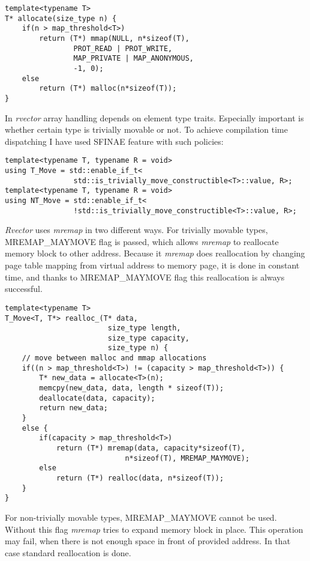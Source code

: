 \documentclass[inz, english, shortabstract]{iithesis}
\begin{document}
\begin{lstlisting}[caption=rvector allocation]
template<typename T>
T* allocate(size_type n) {
	if(n > map_threshold<T>)
    	return (T*) mmap(NULL, n*sizeof(T), 
                PROT_READ | PROT_WRITE,
                MAP_PRIVATE | MAP_ANONYMOUS,
                -1, 0);
    else
    	return (T*) malloc(n*sizeof(T));
}
\end{lstlisting}
In {\it rvector} array handling depends on element type traits. Especially important is whether certain type is trivially movable or not. To achieve compilation time dispatching I have used SFINAE feature with such policies:

\begin{lstlisting}[caption=SFINAE policies]
template<typename T, typename R = void>
using T_Move = std::enable_if_t<
				std::is_trivially_move_constructible<T>::value, R>;
template<typename T, typename R = void>
using NT_Move = std::enable_if_t<
				!std::is_trivially_move_constructible<T>::value, R>;
\end{lstlisting}
{\it Rvector} uses {\it mremap} in two different ways. For trivially movable types, MREMAP\_MAYMOVE flag is passed, which allows {\it mremap} to reallocate memory block to other address. Because it {\it mremap} does reallocation by changing page table mapping from virtual address to memory page\cite{mremap}, it is done in constant time, and thanks to MREMAP\_MAYMOVE flag this reallocation is always successful. 

\begin{lstlisting}[caption=rvector trivial type reallocation]
template<typename T>
T_Move<T, T*> realloc_(T* data, 
						size_type length, 
						size_type capacity, 
						size_type n) {
	// move between malloc and mmap allocations
	if((n > map_threshold<T>) != (capacity > map_threshold<T>)) {
        T* new_data = allocate<T>(n);
        memcpy(new_data, data, length * sizeof(T));
        deallocate(data, capacity);
        return new_data;
    }
    else {
        if(capacity > map_threshold<T>)
        	return (T*) mremap(data, capacity*sizeof(T), 
                    		n*sizeof(T), MREMAP_MAYMOVE);
        else
        	return (T*) realloc(data, n*sizeof(T));
    }
}
\end{lstlisting}
For non-trivially movable types, MREMAP\_MAYMOVE cannot be used. Without this flag {\it mremap} tries to expand memory block in place. This operation may fail, when there is not enough space in front of provided address. In that case standard reallocation is done.
\end{document}
